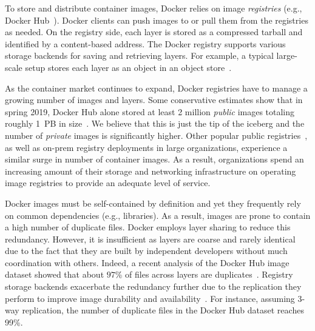 To store and distribute container images, Docker relies on image
\emph{registries} (e.g., Docker Hub~\cite{docker-hub}).
%
Docker clients can push images to or pull them from the registries as needed.
%
On the registry side, each layer is stored as a compressed tarball and
identified by a content-based address.
%
The Docker registry supports various storage backends for saving and retrieving
layers. For example, a typical large-scale setup stores each layer as an object in an
object store~\cite{s3,swift}.

As the container market continues to expand, Docker registries have to manage a
growing number of images and layers.
%
Some conservative estimates show that in spring 2019, Docker Hub alone
stored at least 2 million \emph{public} images totaling roughly 1~PB in
size~\cite{skourtis2019carving,dedupanalysis}. 
%
We believe that this is just the tip of the iceberg and the number of
\emph{private} images is significantly higher.
%
Other popular public
registries~\cite{amazon-ecr,jfrog-artifactory,azure-cr,google-cr}, as well as
on-prem registry deployments in large organizations, experience a similar
surge in number of container images.
%
As a result,
organizations spend an increasing amount of their storage and networking
infrastructure on operating image registries to provide an adequate level of service.

%

Docker images must be self-contained by definition
and yet they frequently rely on common dependencies (e.g., libraries).
%
As a result, images are prone to contain a
high number of duplicate files.
%
Docker employs layer sharing to reduce this redundancy.
%
However, it is insufficient as layers are coarse and rarely identical due to the
fact that they are built by independent developers without much coordination
with others.
%
%
Indeed, a recent analysis of the
Docker Hub image dataset showed that about $97$\% of files across layers are
duplicates~\cite{dedupanalysis}.
%
%
Registry storage backends exacerbate the redundancy further due to the
replication they perform to improve image durability and
availability~\cite{Bonvin:2010:SFS:1807128.1807162}.
%
For instance, assuming 3-way replication, the number of duplicate files in the
Docker Hub dataset reaches 99\%.
%



